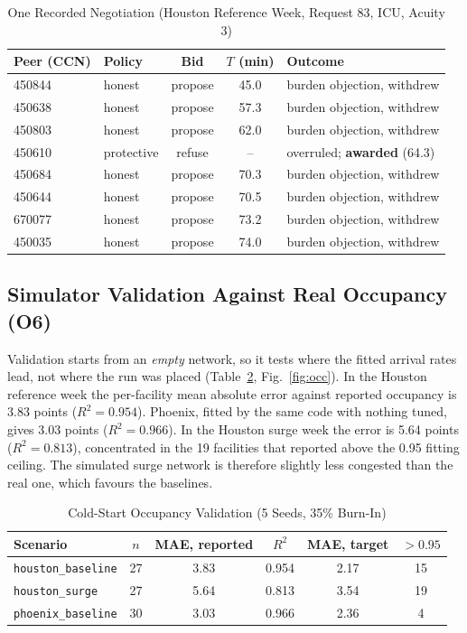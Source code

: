 \begin{table}[!t]
\centering
\caption{One Recorded Negotiation (Houston Reference Week, Request 83, ICU, Acuity 3)}
\label{tab:example}
\scriptsize
\setlength{\tabcolsep}{2pt}
\begin{tabular}{@{}llccl@{}}
\toprule
Peer (CCN) & Policy & Bid & $T$ (min) & Outcome \\
\midrule
450844 & honest & propose & 45.0 & burden objection, withdrew \\
450638 & honest & propose & 57.3 & burden objection, withdrew \\
450803 & honest & propose & 62.0 & burden objection, withdrew \\
450610 & protective & refuse & -- & overruled; \textbf{awarded} (64.3) \\
450684 & honest & propose & 70.3 & burden objection, withdrew \\
450644 & honest & propose & 70.5 & burden objection, withdrew \\
670077 & honest & propose & 73.2 & burden objection, withdrew \\
450035 & honest & propose & 74.0 & burden objection, withdrew \\
\bottomrule
\end{tabular}
\end{table}

\subsection{Simulator Validation Against Real Occupancy (O6)}
\label{sec:res-occ}
Validation starts from an \emph{empty} network, so it tests where the fitted arrival rates lead, not where the run was placed (Table~\ref{tab:occ}, Fig.~\ref{fig:occ}). In the Houston reference week the per-facility mean absolute error against reported occupancy is 3.83 points ($R^2=0.954$). Phoenix, fitted by the same code with nothing tuned, gives 3.03 points ($R^2=0.966$). In the Houston surge week the error is 5.64 points ($R^2=0.813$), concentrated in the 19 facilities that reported above the 0.95 fitting ceiling. The simulated surge network is therefore slightly less congested than the real one, which favours the baselines.

\begin{table}[!t]
\centering
\caption{Cold-Start Occupancy Validation (5 Seeds, 35\% Burn-In)}
\label{tab:occ}
\scriptsize
\setlength{\tabcolsep}{3pt}
\begin{tabular}{@{}lccccc@{}}
\toprule
Scenario & $n$ & MAE, reported & $R^2$ & MAE, target & $>0.95$ \\
\midrule
\texttt{houston\_baseline} & 27 & 3.83 & 0.954 & 2.17 & 15 \\
\texttt{houston\_surge}    & 27 & 5.64 & 0.813 & 3.54 & 19 \\
\texttt{phoenix\_baseline} & 30 & 3.03 & 0.966 & 2.36 & 4 \\
\bottomrule
\end{tabular}
\end{table}

